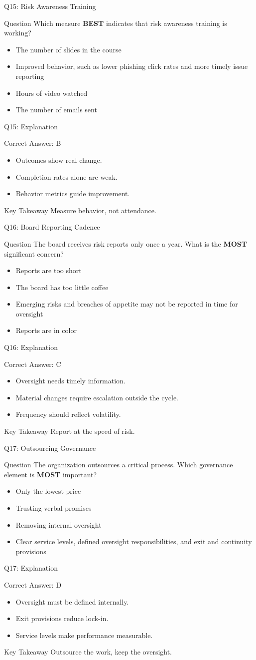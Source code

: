 \documentclass[aspectratio=169]{beamer}
\newcommand{\hq}[7]{%
	\begin{frame}{Q#1: #2}
		\begin{block}{Question}
			#3
		\end{block}
		\begin{itemize}
			#4
		\end{itemize}
	\end{frame}
	\begin{frame}{Q#1: Explanation}
		\begin{block}{Correct Answer: #5}
			\begin{itemize}
				#6
			\end{itemize}
		\end{block}
		\begin{alertblock}{Key Takeaway}
			#7
		\end{alertblock}
	\end{frame}
}
\begin{document}
	\hq{15}{Risk Awareness Training}
	{Which measure \textbf{BEST} indicates that risk awareness training is working?}
	{\item[\textbf{(A)}] The number of slides in the course
		\item[\textbf{(B)}] Improved behavior, such as lower phishing click rates and more timely issue reporting
		\item[\textbf{(C)}] Hours of video watched
		\item[\textbf{(D)}] The number of emails sent}
	{B}
	{\item Outcomes show real change.
		\item Completion rates alone are weak.
		\item Behavior metrics guide improvement.}
	{Measure behavior, not attendance.}
	
	\hq{16}{Board Reporting Cadence}
	{The board receives risk reports only once a year. What is the \textbf{MOST} significant concern?}
	{\item[\textbf{(A)}] Reports are too short
		\item[\textbf{(B)}] The board has too little coffee
		\item[\textbf{(C)}] Emerging risks and breaches of appetite may not be reported in time for oversight
		\item[\textbf{(D)}] Reports are in color}
	{C}
	{\item Oversight needs timely information.
		\item Material changes require escalation outside the cycle.
		\item Frequency should reflect volatility.}
	{Report at the speed of risk.}
	
	\hq{17}{Outsourcing Governance}
	{The organization outsources a critical process. Which governance element is \textbf{MOST} important?}
	{\item[\textbf{(A)}] Only the lowest price
		\item[\textbf{(B)}] Trusting verbal promises
		\item[\textbf{(C)}] Removing internal oversight
		\item[\textbf{(D)}] Clear service levels, defined oversight responsibilities, and exit and continuity provisions}
	{D}
	{\item Oversight must be defined internally.
		\item Exit provisions reduce lock-in.
		\item Service levels make performance measurable.}
	{Outsource the work, keep the oversight.}
	
\end{document}
